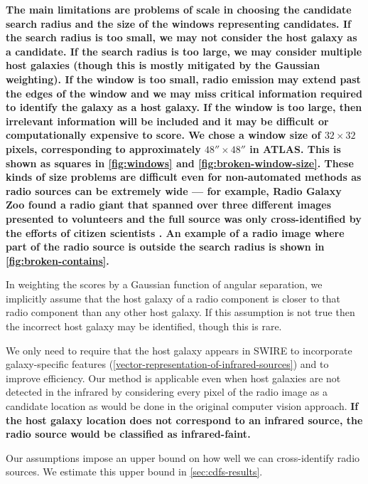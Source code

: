 \documentclass[fleqn,usenatbib,usedcolumn]{mnras}
\newcommand{\edited}[1]{{\bf {#1}}}
\begin{document}
    \edited{The main limitations are problems of scale in choosing the
    candidate search radius and the size of the windows
    representing candidates. If the search radius is too small, we may not
    consider the host galaxy as a candidate. If the search radius is too
    large, we may consider multiple host galaxies (though this is mostly
    mitigated by the Gaussian weighting). If the window is too small, radio
    emission may extend past the edges of the window and we may miss critical
    information required to identify the galaxy as a host galaxy. If the
    window is too large, then irrelevant information will be included and it
    may be difficult or computationally expensive to score. We chose a
    window size of $32 \times 32$ pixels, corresponding to approximately $48'' \times 48''$ in
    ATLAS. This is shown as squares in \autoref{fig:windows} and
    \autoref{fig:broken-window-size}. These kinds of size problems are
    difficult even for non-automated methods as radio sources can be extremely
    wide --- for example, Radio Galaxy Zoo found a radio giant that spanned
    over three different images presented to volunteers and the full source
    was only cross-identified by the efforts of citizen scientists
    \citep{banfield15}. An example of a radio image where part of the radio
    source is outside the search radius is shown in
    \autoref{fig:broken-contains}.}

    In weighting the scores by a Gaussian function of angular
    separation, we implicitly assume that the host galaxy of a radio component
    is closer to that radio component than any other host galaxy. If this
    assumption is not true then the incorrect host galaxy may be identified, though
    this is rare.

    We only need to require that the host galaxy appears in SWIRE to
    incorporate galaxy-specific features
    (\autoref{vector-representation-of-infrared-sources}) and to improve
    efficiency. Our method is applicable even when host galaxies are not detected in
    the infrared by considering every pixel of the radio image as a candidate
    location as would be done in the original computer vision approach. \edited{If the host galaxy location does not correspond to an infrared source, the radio source would be classified as infrared-faint.}

    Our assumptions impose an upper bound on how well we can cross-identify
    radio sources. We estimate this upper bound in \autoref{sec:cdfs-results}.
\end{document}
